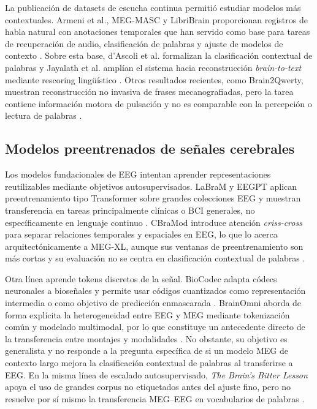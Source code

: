 La publicación de datasets de escucha continua permitió estudiar modelos más contextuales. Armeni et al., MEG-MASC y LibriBrain proporcionan registros de habla natural con anotaciones temporales que han servido como base para tareas de recuperación de audio, clasificación de palabras y ajuste de modelos de contexto \cite{armeni2022meg,gwilliams2023megmasc,ozdogan2025libribrain}. Sobre esta base, d'Ascoli et al. formalizan la clasificación contextual de palabras y Jayalath et al. amplían el sistema hacia reconstrucción \textit{brain-to-text} mediante rescoring lingüístico \cite{dascoli2025words,jayalath2025unlocking}. Otros resultados recientes, como Brain2Qwerty, muestran reconstrucción no invasiva de frases mecanografiadas, pero la tarea contiene información motora de pulsación y no es comparable con la percepción o lectura de palabras \cite{levy2026brain2qwerty}.

\subsection{Modelos preentrenados de señales cerebrales}

Los modelos fundacionales de EEG intentan aprender representaciones reutilizables mediante objetivos autosupervisados. LaBraM y EEGPT aplican preentrenamiento tipo Transformer sobre grandes colecciones EEG y muestran transferencia en tareas principalmente clínicas o BCI generales, no específicamente en lenguaje continuo \cite{jiang2024labram,wang2024eegpt}. CBraMod introduce atención \textit{criss-cross} para separar relaciones temporales y espaciales en EEG, lo que lo acerca arquitectónicamente a MEG-XL, aunque sus ventanas de preentrenamiento son más cortas y su evaluación no se centra en clasificación contextual de palabras \cite{wang2025cbramod}.

Otra línea aprende tokens discretos de la señal. BioCodec adapta códecs neuronales a bioseñales y permite usar códigos cuantizados como representación intermedia o como objetivo de predicción enmascarada \cite{avramidis2025biocodec}. BrainOmni aborda de forma explícita la heterogeneidad entre EEG y MEG mediante tokenización común y modelado multimodal, por lo que constituye un antecedente directo de la transferencia entre montajes y modalidades \cite{xiao2025brainomni}. No obstante, su objetivo es generalista y no responde a la pregunta específica de si un modelo MEG de contexto largo mejora la clasificación contextual de palabras al transferirse a EEG. En la misma línea de escalado autosupervisado, \textit{The Brain's Bitter Lesson} apoya el uso de grandes corpus no etiquetados antes del ajuste fino, pero no resuelve por sí mismo la transferencia MEG--EEG en vocabularios de palabras \cite{jayalath2025bitter}.

